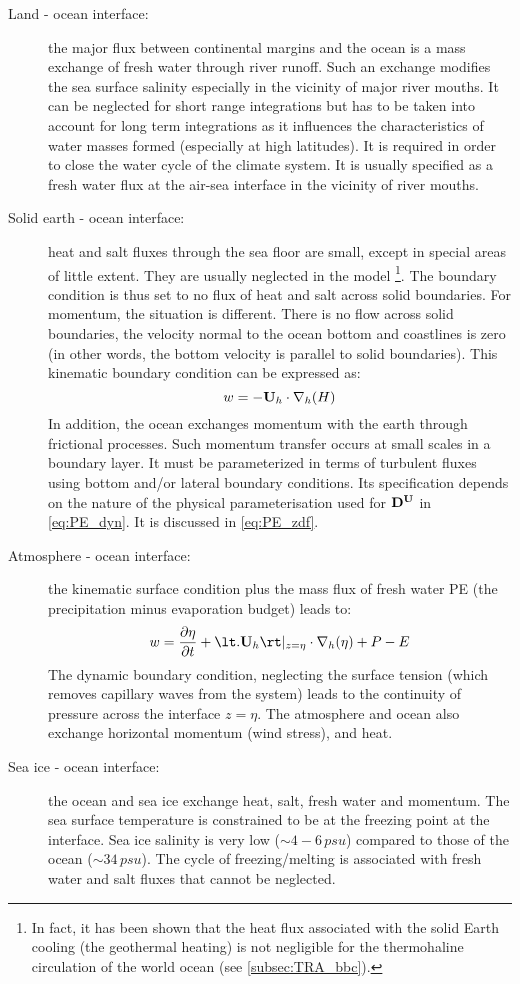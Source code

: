 \documentclass[../main/NEMO_manual]{subfiles}
\begin{document}
\begin{description}
\item[Land - ocean interface:]
  the major flux between continental margins and the ocean is a mass exchange of fresh water through river runoff.
  Such an exchange modifies the sea surface salinity especially in the vicinity of major river mouths.
  It can be neglected for short range integrations but has to be taken into account for long term integrations as
  it influences the characteristics of water masses formed (especially at high latitudes).
  It is required in order to close the water cycle of the climate system.
  It is usually specified as a fresh water flux at the air-sea interface in the vicinity of river mouths.
\item[Solid earth - ocean interface:]
  heat and salt fluxes through the sea floor are small, except in special areas of little extent.
  They are usually neglected in the model
  \footnote{
    In fact, it has been shown that the heat flux associated with the solid Earth cooling
    (\ie the geothermal heating) is not negligible for the thermohaline circulation of the world ocean
    (see \autoref{subsec:TRA_bbc}).
  }.
  The boundary condition is thus set to no flux of heat and salt across solid boundaries.
  For momentum, the situation is different. There is no flow across solid boundaries,
  \ie the velocity normal to the ocean bottom and coastlines is zero (in other words,
  the bottom velocity is parallel to solid boundaries). This kinematic boundary condition
  can be expressed as:
  \begin{equation}
    \label{eq:PE_w_bbc}
    w = - \mathbf{U}_h \cdot \nabla_h (H)
  \end{equation}
  In addition, the ocean exchanges momentum with the earth through frictional processes.
  Such momentum transfer occurs at small scales in a boundary layer.
  It must be parameterized in terms of turbulent fluxes using bottom and/or lateral boundary conditions.
  Its specification depends on the nature of the physical parameterisation used for
  $\mathbf{D}^{\mathbf{U}}$ in \autoref{eq:PE_dyn}.
  It is discussed in \autoref{eq:PE_zdf}.%
\item[Atmosphere - ocean interface:]
  the kinematic surface condition plus the mass flux of fresh water PE (the precipitation minus evaporation budget)
  leads to:
  \[
    w = \pd[\eta]{t} + \lt. \vect U_h \rt|_{z = \eta} \cdot \nabla_h (\eta) + P - E
  \]
  The dynamic boundary condition, neglecting the surface tension (which removes capillary waves from the system)
  leads to the continuity of pressure across the interface $z = \eta$.
  The atmosphere and ocean also exchange horizontal momentum (wind stress), and heat.
\item[Sea ice - ocean interface:]
  the ocean and sea ice exchange heat, salt, fresh water and momentum.
  The sea surface temperature is constrained to be at the freezing point at the interface.
  Sea ice salinity is very low ($\sim4-6 \, psu$) compared to those of the ocean ($\sim34 \, psu$).
  The cycle of freezing/melting is associated with fresh water and salt fluxes that cannot be neglected.
\end{description}
\end{document}
